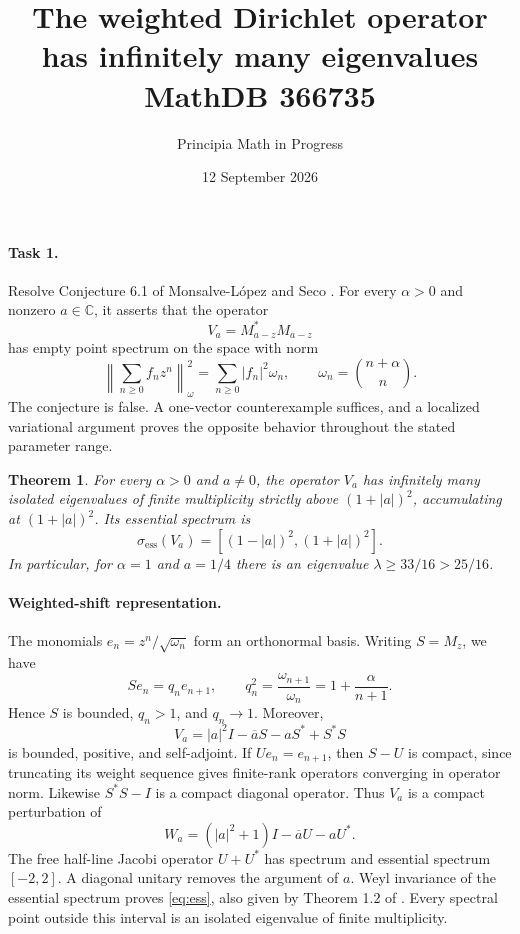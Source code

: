 \documentclass[11pt]{article}
\title{The weighted Dirichlet operator has infinitely many eigenvalues\\
\large MathDB 366735}
\author{Principia Math in Progress}
\date{12 September 2026}
\newtheorem{theorem}{Theorem}
\newcommand{\ess}{\mathrm{ess}}
\begin{document}
\maketitle

\paragraph{Task 1.}
Resolve Conjecture 6.1 of Monsalve-L\'opez and Seco \cite{MS}.
For every $\alpha>0$ and nonzero $a\in\mathbb C$, it asserts that the operator
\[
 V_a=M_{a-z}^*M_{a-z}
\]
has empty point spectrum on the space with norm
\[
 \left\|\sum_{n\geq0}f_nz^n\right\|_\omega^2
 =\sum_{n\geq0}|f_n|^2\omega_n,\qquad
 \omega_n=\binom{n+\alpha}{n}.
\]
The conjecture is false. A one-vector counterexample suffices, and a
localized variational argument proves the opposite behavior throughout
the stated parameter range.

\begin{theorem}\label{thm:infinite}
For every $\alpha>0$ and $a\ne0$, the operator $V_a$ has infinitely many
isolated eigenvalues of finite multiplicity strictly above $(1+|a|)^2$,
accumulating at $(1+|a|)^2$. Its essential spectrum is
\begin{equation}\label{eq:ess}
 \sigma_{\ess}(V_a)=[(1-|a|)^2,(1+|a|)^2].
\end{equation}
In particular, for $\alpha=1$ and $a=1/4$ there is an eigenvalue
$\lambda\geq33/16>25/16$.
\end{theorem}

\paragraph{Weighted-shift representation.}
The monomials $e_n=z^n/\sqrt{\omega_n}$ form an orthonormal basis.
Writing $S=M_z$, we have
\begin{equation}\label{eq:shift}
 Se_n=q_ne_{n+1},\qquad
 q_n^2=\frac{\omega_{n+1}}{\omega_n}
      =1+\frac{\alpha}{n+1}.
\end{equation}
Hence $S$ is bounded, $q_n>1$, and $q_n\to1$. Moreover,
\begin{equation}\label{eq:operator}
 V_a=|a|^2I-\overline aS-aS^*+S^*S
\end{equation}
is bounded, positive, and self-adjoint.
If $Ue_n=e_{n+1}$, then $S-U$ is compact, since truncating its weight
sequence gives finite-rank operators converging in operator norm.
Likewise $S^*S-I$ is a compact diagonal operator. Thus $V_a$ is a compact
perturbation of
\[
 W_a=(|a|^2+1)I-\overline aU-aU^*.
\]
The free half-line Jacobi operator $U+U^*$ has spectrum and essential
spectrum $[-2,2]$. A diagonal unitary removes the argument of $a$.
Weyl invariance of the essential spectrum proves \eqref{eq:ess},
also given by Theorem 1.2 of \cite{MS}.
Every spectral point outside this interval is an isolated eigenvalue
of finite multiplicity.
\end{document}
